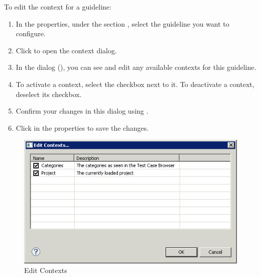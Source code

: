 To edit the context for a guideline:
\begin{enumerate}
\item In the \gdproject{} properties, under the section , select the guideline you want to configure.
\item Click  to open the context dialog.
\item In the dialog (), you can see and edit any available contexts for this guideline. 
\item To activate a context, select the checkbox next to it. To deactivate a context, deselect its checkbox.
\item Confirm your changes in this dialog using .
\item Click  in the \gdproject{} properties to save the changes. 
\end{enumerate}


\begin{figure}[p]
\begin{center}
\includegraphics{Tasks/Teststyle/PS/contexts}
\caption{Edit Contexts}
\label{contexts}
\end{center}
\end{figure}
